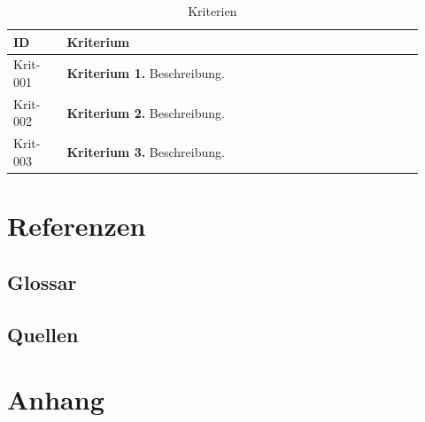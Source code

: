 \documentclass{article}
\begin{document}
\begin{table}
  \centering
  \begin{tabular}{p{0.12\linewidth}|p{0.8\linewidth}}
    ID       & Kriterium                           \\
    \hline
    Krit-001 & \textbf{Kriterium 1.} Beschreibung. \\
    \hline
    Krit-002 & \textbf{Kriterium 2.} Beschreibung. \\
    \hline
    Krit-003 & \textbf{Kriterium 3.} Beschreibung. \\
  \end{tabular}
  \caption{Kriterien}
  \label{tbl:krit}
\end{table}

\clearpage
\section{Referenzen}
\subsection{Glossar}
\printnoidxglossary[title=\large Wörter]
\printnoidxglossary[type=\acronymtype,title=\large Akronyme]

\subsection{Quellen}
\printbibliography[heading=none]

\listoffigures

\listoftables

\section{Anhang}
\end{document}
